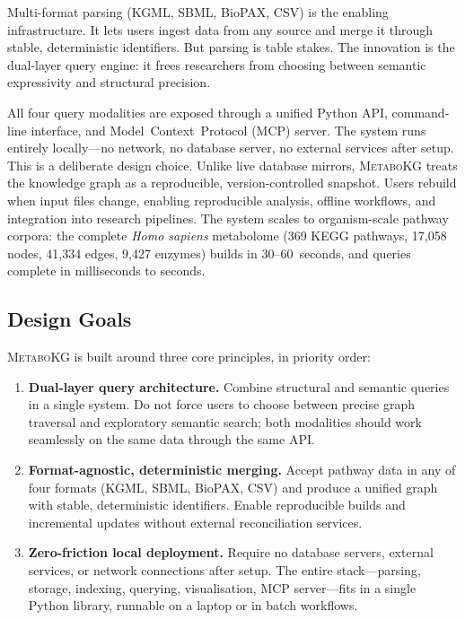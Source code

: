 \documentclass[10pt]{article}
\begin{document}
Multi-format parsing (KGML, SBML, BioPAX, CSV) is the enabling
infrastructure. It lets users ingest data from any source and merge it through
stable, deterministic identifiers. But parsing is table stakes. The innovation
is the dual-layer query engine: it frees researchers from choosing between
semantic expressivity and structural precision.

All four query modalities are exposed through a unified Python API,
command-line interface, and Model~Context~Protocol (MCP) server. The system
runs entirely locally---no network, no database server, no external services
after setup. This is a deliberate design choice. Unlike live database mirrors,
\textsc{MetaboKG} treats the knowledge graph as a reproducible,
version-controlled snapshot. Users rebuild when input files change, enabling
reproducible analysis, offline workflows, and integration into research
pipelines. The system scales to organism-scale pathway corpora: the complete
\textit{Homo sapiens} metabolome (369 KEGG pathways, 17,058 nodes, 41,334
edges, 9,427 enzymes) builds in 30--60~seconds, and queries complete in
milliseconds to seconds.

\subsection{Design Goals}

\textsc{MetaboKG} is built around three core principles, in priority order:

\begin{enumerate}[leftmargin=*, itemsep=2pt]
\item \textbf{Dual-layer query architecture.} Combine structural and semantic
  queries in a single system. Do not force users to choose between precise
  graph traversal and exploratory semantic search; both modalities should work
  seamlessly on the same data through the same API.

\item \textbf{Format-agnostic, deterministic merging.} Accept pathway data in
  any of four formats (KGML, SBML, BioPAX, CSV) and produce a unified graph
  with stable, deterministic identifiers. Enable reproducible builds and
  incremental updates without external reconciliation services.

\item \textbf{Zero-friction local deployment.} Require no database servers,
  external services, or network connections after setup. The entire
  stack---parsing, storage, indexing, querying, visualisation, MCP
  server---fits in a single Python library, runnable on a laptop or in batch
  workflows.
\end{enumerate}
\end{document}

